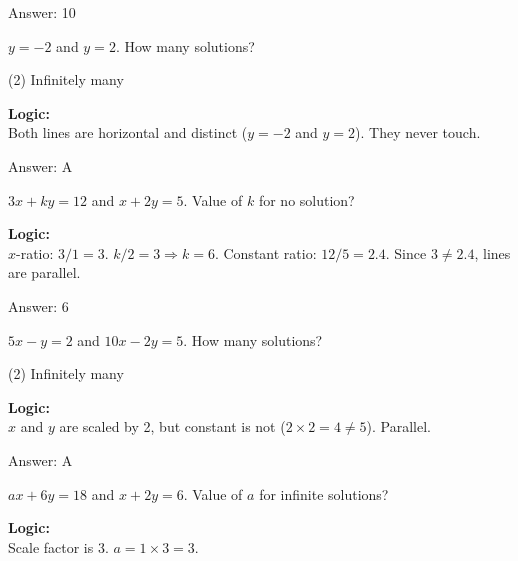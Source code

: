 \documentclass[11pt,paper=a4,answers]{exam}
\begin{document}
\begin{questions}
\begin{solution}
\vspace{15pt}
Answer: \colorbox{yellow!100}{10}
\end{solution}

\question
$y = -2$ and $y = 2$. How many solutions?
\begin{tasks}(2)
    \task Infinitely many
\end{tasks}

\begin{solution}
\textbf{Logic:} \\
Both lines are horizontal and distinct ($y=-2$ and $y=2$). They never touch.

\vspace{15pt}
Answer: \colorbox{yellow!100}{A}
\end{solution}

\question
$3x + ky = 12$ and $x + 2y = 5$. Value of $k$ for no solution?

\begin{solution}
\textbf{Logic:} \\
$x$-ratio: $3/1 = 3$.
$k/2 = 3 \Rightarrow k = 6$.
Constant ratio: $12/5 = 2.4$. Since $3 \neq 2.4$, lines are parallel.

\vspace{15pt}
Answer: \colorbox{yellow!100}{6}
\end{solution}

\question
$5x - y = 2$ and $10x - 2y = 5$. How many solutions?
\begin{tasks}(2)
    \task Infinitely many
\end{tasks}

\begin{solution}
\textbf{Logic:} \\
$x$ and $y$ are scaled by 2, but constant is not ($2 \times 2 = 4 \neq 5$). Parallel.

\vspace{15pt}
Answer: \colorbox{yellow!100}{A}
\end{solution}

\question
$ax + 6y = 18$ and $x + 2y = 6$. Value of $a$ for infinite solutions?

\begin{solution}
\textbf{Logic:} \\
Scale factor is 3. $a = 1 \times 3 = 3$.


\end{solution}
\end{questions}
\end{document}
